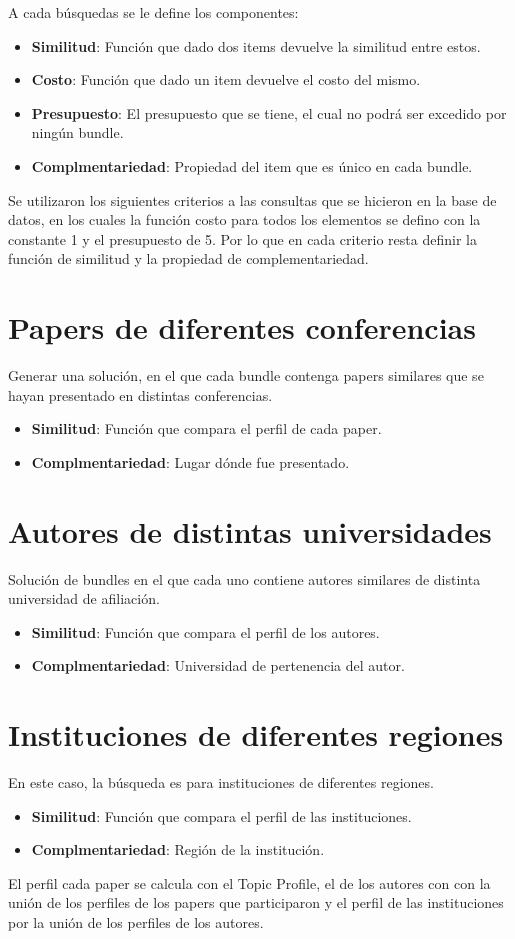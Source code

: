 A cada búsquedas se le define los componentes:
\begin{itemize}
  \item \textbf{Similitud}: Función que dado dos items devuelve la similitud entre estos.
  \item \textbf{Costo}: Función que dado un item devuelve el costo del mismo.
  \item \textbf{Presupuesto}: El presupuesto que se tiene, el cual no podrá ser excedido por ningún bundle.
  \item \textbf{Complmentariedad}: Propiedad del item que es único en cada bundle.
\end{itemize}

Se utilizaron los siguientes criterios a las consultas que se hicieron en la base de datos, 
en los cuales la función costo para todos los elementos se defino con la constante 1 y el presupuesto de 5.
Por lo que en cada criterio resta definir la función de similitud y la propiedad de complementariedad.

\section{Papers de diferentes conferencias}\label{bus:papSimDisLug}
Generar una solución, en el que cada bundle contenga 
papers similares que se hayan presentado en distintas conferencias.\\
\begin{itemize}
  \item \textbf{Similitud}: Función que compara el perfil de cada paper.
  \item \textbf{Complmentariedad}: Lugar dónde fue presentado.
\end{itemize}

\section{Autores de distintas universidades}
Solución de bundles en el que cada uno contiene autores 
similares de distinta universidad de afiliación.\\
\begin{itemize}
  \item \textbf{Similitud}: Función que compara el perfil de los autores.
  \item \textbf{Complmentariedad}: Universidad de pertenencia del autor.
\end{itemize}

\section{Instituciones de diferentes regiones}
En este caso, la búsqueda es para instituciones de diferentes regiones. 
\begin{itemize}
  \item \textbf{Similitud}: Función que compara el perfil de las instituciones.
  \item \textbf{Complmentariedad}: Región de la institución.
\end{itemize}

El perfil cada paper se calcula con el Topic Profile, el de los autores con con la unión de los perfiles de los papers que participaron
y el perfil de las instituciones por la unión de los perfiles de los autores.
